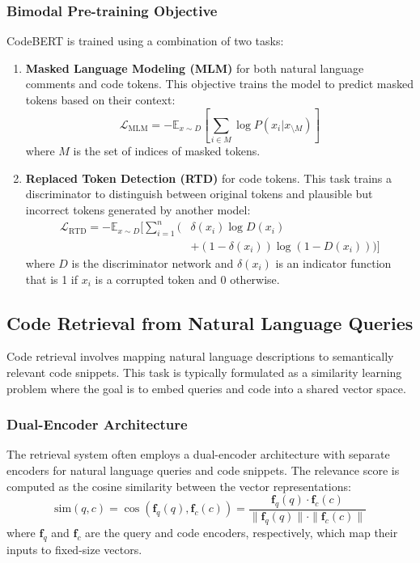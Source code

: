 \documentclass[conference]{IEEEtran}
\begin{document}
\subsubsection{Bimodal Pre-training Objective}
CodeBERT is trained using a combination of two tasks:
\begin{enumerate}
    \item \textbf{Masked Language Modeling (MLM)} for both natural language comments and code tokens. This objective trains the model to predict masked tokens based on their context:
    \begin{equation}
        \mathcal{L}_{\text{MLM}} = -\mathbb{E}_{x \sim D}\left[\sum_{i \in M} \log P(x_i | x_{\setminus M})\right]
        \label{eq:mlm_loss}
    \end{equation}
    where $M$ is the set of indices of masked tokens.

    \item \textbf{Replaced Token Detection (RTD)} for code tokens. This task trains a discriminator to distinguish between original tokens and plausible but incorrect tokens generated by another model:
    \begin{equation}
    \begin{split}
        \mathcal{L}_{\text{RTD}} = -\mathbb{E}_{x \sim D}\Bigg[\sum_{i=1}^n \Big( &\delta(x_i) \log D(x_i) \\
        & + (1-\delta(x_i)) \log(1 - D(x_i)) \Big)\Bigg]
    \end{split}
    \label{eq:rtd_loss}
    \end{equation}
    where $D$ is the discriminator network and $\delta(x_i)$ is an indicator function that is 1 if $x_i$ is a corrupted token and 0 otherwise.
\end{enumerate}

\subsection{Code Retrieval from Natural Language Queries}
\label{ssec:code_retrieval}
Code retrieval involves mapping natural language descriptions to semantically relevant code snippets. This task is typically formulated as a similarity learning problem where the goal is to embed queries and code into a shared vector space.

\subsubsection{Dual-Encoder Architecture}
The retrieval system often employs a dual-encoder architecture with separate encoders for natural language queries and code snippets. The relevance score is computed as the cosine similarity between the vector representations:
\begin{equation}
    \text{sim}(q, c) = \cos(\mathbf{f}_q(q), \mathbf{f}_c(c)) = \frac{\mathbf{f}_q(q) \cdot \mathbf{f}_c(c)}{\|\mathbf{f}_q(q)\| \cdot \|\mathbf{f}_c(c)\|}
    \label{eq:cosine_similarity}
\end{equation}
where $\mathbf{f}_q$ and $\mathbf{f}_c$ are the query and code encoders, respectively, which map their inputs to fixed-size vectors.
\end{document}
